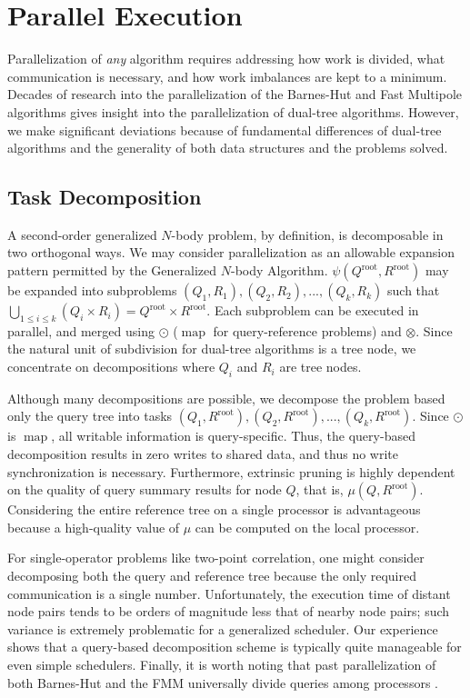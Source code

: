 \documentclass[twoside,leqno,twocolumn]{article}
\newcommand{\Union}{\bigcup}
\DeclareMathOperator*{\map}{map}
\newcommand{\gnp}{\psi}
\newcommand{\kdroot}[1]{#1^{\text{root}}}
\newcommand{\lettermu}{\mu}
\newcommand{\inmu}{\mu}
\begin{document}
\section{Parallel Execution}

Parallelization of {\em any} algorithm requires addressing how work is divided, what communication is necessary, and how work imbalances are kept to a minimum.
Decades of research into the parallelization of the Barnes-Hut and Fast Multipole algorithms gives insight into the parallelization of dual-tree algorithms.
However, we make significant deviations because of fundamental differences of dual-tree algorithms and the generality of both data structures and the problems solved.

\subsection{Task Decomposition}

A second-order generalized $N$-body problem, by definition, is decomposable in two orthogonal ways.
We may consider parallelization as an allowable expansion pattern permitted by the Generalized $N$-body Algorithm.
$\gnp(\kdroot{Q}, \kdroot{R})$ may be expanded into subproblems $(Q_1,R_1), (Q_2,R_2), ..., (Q_k, R_k)$ such that $\Union_{1 \leq i \leq k} (Q_i \times R_i) = \kdroot{Q} \times \kdroot{R}$.
Each subproblem can be executed in parallel, and merged using $\odot$ ($\map$ for query-reference problems) and $\otimes$.
Since the natural unit of subdivision for dual-tree algorithms is a tree node, we concentrate on decompositions where $Q_i$ and $R_i$ are tree nodes.

Although many decompositions are possible, we decompose the problem based only the query tree into tasks $(Q_1, \kdroot{R}), (Q_2, \kdroot{R}), ..., (Q_k, \kdroot{R})$.
Since $\odot$ is $\map$, all writable information is query-specific.
Thus, the query-based decomposition results in zero writes to shared data, and thus no write synchronization is necessary.
Furthermore, extrinsic pruning is highly dependent on the quality of query summary results for node $Q$, that is, $\inmu(Q, \kdroot{R})$.
Considering the entire reference tree on a single processor is advantageous because a high-quality value of $\lettermu$ can be computed on the local processor.

For single-operator problems like two-point correlation, one might consider decomposing both the query and reference tree because the only required communication is a single number.
Unfortunately, the execution time of distant node pairs tends to be orders of magnitude less that of nearby node pairs; such variance is extremely problematic for a generalized scheduler.
Our experience shows that a query-based decomposition scheme is typically quite manageable for even simple schedulers.
Finally, it is worth noting that past parallelization of both Barnes-Hut and the FMM universally divide queries among processors \cite{salmon_thesis, singh_thesis, liu94experiences}.
\end{document}
